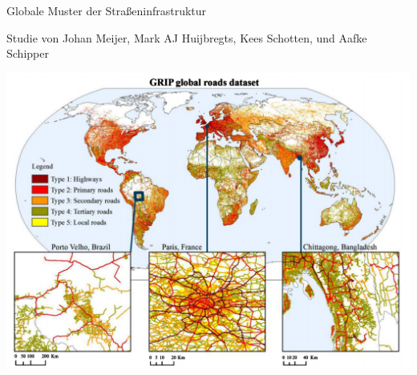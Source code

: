 \documentclass[ignorenonframetext,]{beamer}
\begin{document}
\begin{frame}{Globale Muster der Straßeninfrastruktur}

\begin{block}{Studie von Johan Meijer, Mark AJ Huijbregts, Kees
Schotten, und Aafke Schipper}

\includegraphics{figure/GRIP_globalroads.PNG}

\end{block}

\end{frame}
\end{document}
